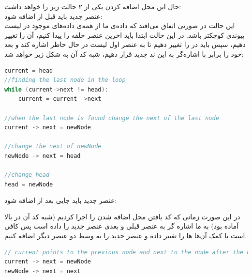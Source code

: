 \documentclass{article}
\begin{document}
\begin{enumerate}
\begin{enumerate}
\begin{latin}
\begin{flushright}
\begin{lstlisting}[language=C]
\end{lstlisting}
\end{flushright}								
\end{latin}
حال این محل اضافه کردن یکی از ۲ حالت زیر را خواهد داشت:\\
\lr{*} عنصر جدید باید قبل از  اضافه شود:\\
این حالت در صورتی اتفاق می‌افتد که داده‌ی ما از همه‌ی داده‌های موجود در لیست پیوندی کوچکتر باشد. در این حالت ابتدا باید اخرین عنصر حلقه را پیدا کنیم،  آن را تغییر دهیم، سپس باید  در  را تغییر دهیم تا به عنصر اول لیست در حال حاظر اشاره کند و بعد خود  را برابر با اشاره‌گر به این ند جدید قرار دهیم، شبه کد آن به شکل زیر خواهد شد:


\begin{latin}
\begin{flushright}				
\begin{lstlisting}[language=C]
current = head
//finding the last node in the loop
while (current->next != head):
	current = current ->next

//when the last node is found change the next of the last node 
current -> next = newNode

//change the next of newNode 
newNode -> next = head

//change head
head = newNode

\end{lstlisting}
\end{flushright}								
\end{latin}

\lr{*} عنصر جدید باید جایی بعد از  اضافه شود:

در این صورت زمانی که کد یافتن محل اضافه شدن را اجرا کردیم (شبه کد آن در بالا آماده بود) به ما اشاره گر به عنصر قبلی و بعدی عنصر جدید را داده است پس کافی است با کمک آن‌ها  ها را تغییر داده و عنصر جدید را به وسط دو عنصر دیگر اضافه کنیم. 

\begin{latin}
\begin{flushright}				
\begin{lstlisting}[language=C]
// current points to the previous node and next to the node after the one we are inserting 
current -> next = newNode 
newNode -> next = next 
\end{lstlisting}
\end{flushright}								
\end{latin}


\end{enumerate}
\end{enumerate}
\end{document}

